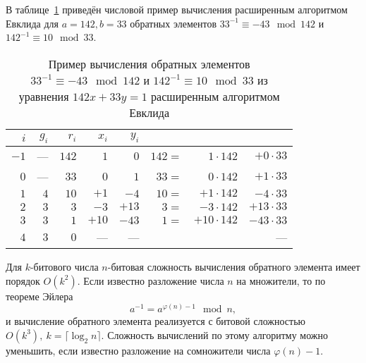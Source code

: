 \example
В таблице~\ref{tab:extended-euclid-inverse} приведён числовой пример вычисления расширенным алгоритмом Евклида для $a=142, b=33$ обратных элементов $33^{-1} \equiv -43 \mod 142$ и $142^{-1} \equiv 10 \mod 33$.

\begin{table}[!ht]
    \centering
    \caption{Пример вычисления обратных элементов $33^{-1} \equiv -43 \mod 142$ и $142^{-1} \equiv 10 \mod 33$ из уравнения $142 x + 33 y = 1$ расширенным алгоритмом Евклида\label{tab:extended-euclid-inverse}}
    \begin{tabular}{|r|r|r|r|r|rrr|}
        \hline
        $i$ & $g_i$ & $r_i$ & $x_i$ & $y_i$ & & & \\
        \hline
        $-1$ &  --- & $142$ &   $1$ &   $0$ & $142 =$ & $  1 \cdot 142$ & $ + 0 \cdot 33$ \\
	 $0$ &  --- &  $33$ &   $0$ &   $1$ &  $33 =$ & $  0 \cdot 142$ & $ + 1 \cdot 33$ \\
	 $1$ &  $4$ &  $10$ &  $+1$ &  $-4$ &  $10 =$ & $ +1 \cdot 142$ & $ - 4 \cdot 33$ \\
	 $2$ &  $3$ &   $3$ &  $-3$ & $+13$ &   $3 =$ & $ -3 \cdot 142$ & $+ 13 \cdot 33$ \\
	 $3$ &  $3$ &   $1$ & $+10$ & $-43$ &   $1 =$ & $+10 \cdot 142$ & $- 43 \cdot 33$ \\
	 $4$ &  $3$ &   $0$ &   --- &   --- & & & --- \\
        \hline
    \end{tabular}
\end{table}
\exampleend

Для $k$-битового числа $n$-битовая сложность вычисления обратного элемента имеет порядок $O(k^2)$. Если известно разложение числа $n$ на множители, то по теореме Эйлера
    \[ a^{-1} = a^{\varphi(n) - 1} \mod n, \]
и вычисление обратного элемента реализуется с битовой сложностью $O(k^3),~ k = \lceil \log_2 n \rceil$. Сложность вычислений по этому алгоритму можно уменьшить, если известно разложение на сомножители числа $\varphi(n) - 1$.
